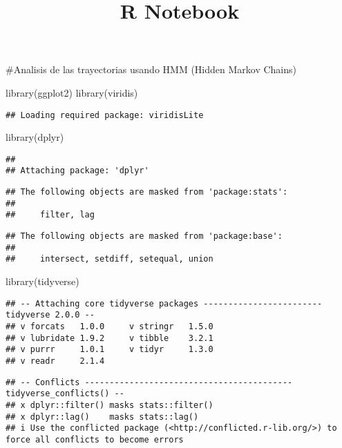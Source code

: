 \documentclass[
]{article}
\title{R Notebook}
\author{}
\date{\vspace{-2.5em}}
\newenvironment{Shaded}{\begin{snugshade}}{\end{snugshade}}
\newcommand{\FunctionTok}[1]{\textcolor[rgb]{0.00,0.00,0.00}{#1}}
\newcommand{\NormalTok}[1]{#1}
\begin{document}
\maketitle

\#Analisis de las trayectorias usando HMM (Hidden Markov Chains)

\begin{Shaded}
\begin{Highlighting}[]
\FunctionTok{library}\NormalTok{(ggplot2)}
\FunctionTok{library}\NormalTok{(viridis)}
\end{Highlighting}
\end{Shaded}

\begin{verbatim}
## Loading required package: viridisLite
\end{verbatim}

\begin{Shaded}
\begin{Highlighting}[]
\FunctionTok{library}\NormalTok{(dplyr)}
\end{Highlighting}
\end{Shaded}

\begin{verbatim}
## 
## Attaching package: 'dplyr'
\end{verbatim}

\begin{verbatim}
## The following objects are masked from 'package:stats':
## 
##     filter, lag
\end{verbatim}

\begin{verbatim}
## The following objects are masked from 'package:base':
## 
##     intersect, setdiff, setequal, union
\end{verbatim}

\begin{Shaded}
\begin{Highlighting}[]
\FunctionTok{library}\NormalTok{(tidyverse)}
\end{Highlighting}
\end{Shaded}

\begin{verbatim}
## -- Attaching core tidyverse packages ------------------------ tidyverse 2.0.0 --
## v forcats   1.0.0     v stringr   1.5.0
## v lubridate 1.9.2     v tibble    3.2.1
## v purrr     1.0.1     v tidyr     1.3.0
## v readr     2.1.4
\end{verbatim}

\begin{verbatim}
## -- Conflicts ------------------------------------------ tidyverse_conflicts() --
## x dplyr::filter() masks stats::filter()
## x dplyr::lag()    masks stats::lag()
## i Use the conflicted package (<http://conflicted.r-lib.org/>) to force all conflicts to become errors
\end{verbatim}
\end{document}
